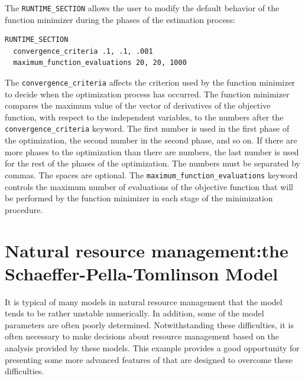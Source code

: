 \documentclass{admbmanual}
\begin{document}
The \texttt{RUNTIME\_SECTION} allows the user to modify
the default behavior of the function minimizer during the 
phases of the estimation process:
\begin{lstlisting}
RUNTIME_SECTION
  convergence_criteria .1, .1, .001
  maximum_function_evaluations 20, 20, 1000
\end{lstlisting}
The \texttt{convergence\_criteria} affects the criterion used by
the function minimizer to decide when the optimization process has 
occurred.  The function minimizer compares the maximum value of the
vector of derivatives of the objective function, with respect to the
independent variables, to the numbers after the
\texttt{convergence\_criteria} keyword. The first number is used in the
first phase of the optimization, the second number in the second phase,
and so on. If there are more phases to the optimization than
there are numbers, the last number is used for the rest of the
phases of the optimization.
The numbers must be separated by commas. The spaces are optional.
The \texttt{maximum\_function\_evaluations} keyword controls the 
maximum number of evaluations of the
objective function that will be performed by the function minimizer
in each stage of the minimization procedure.


\section{Natural resource management:\br the Schaeffer-Pella-Tomlinson Model}

It is typical of many models in
natural resource management that the model tends to be
rather unstable numerically.  In addition, some of the model
parameters are often poorly determined. Notwithstanding these
difficulties, it is often necessary to make decisions
about resource management based on the analysis provided by
these models. This example
provides a good opportunity for presenting some more advanced
features of \ADM that are designed to
overcome these difficulties.
\end{document}
